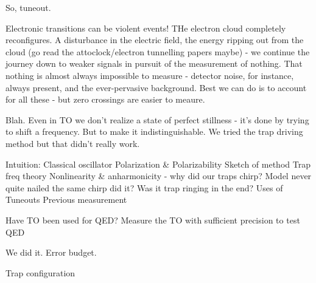 So, tuneout.

Electronic transitions can be violent events! THe electron cloud
completely reconfigures.
	A disturbance in the electric field, the energy
ripping out from the cloud (go read the attoclock/electron tunnelling
papers maybe) - we continue the journey down to weaker signals in
pursuit of the measurement of nothing.
	That nothing is almost always
impossible to measure - detector noise, for instance, always present,
and the ever-pervasive background.
	Best we can do is to account for all
these - but zero crossings are easier to meaure.

Blah.
	Even in TO we don't realize a state of perfect stillness - it's
done by trying to shift a frequency.
	But to make it indistinguishable.
We tried the trap driving method but that didn't really work.




Intuition: Classical oscillator
Polarization \& Polarizability 
Sketch of method
Trap freq theory
Nonlinearity \& anharmonicity - why did our traps chirp? Model never quite nailed the same chirp did it? Was it trap ringing in the end?
Uses of Tuneouts
Previous measurement




Have TO been used for QED?
Measure the TO with sufficient precision to test QED




We did it.
Error budget.



Trap configuration

